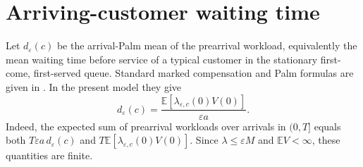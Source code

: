 \documentclass[10pt,a4paper]{amsart}
\numberwithin{equation}{section}
\newcommand{\E}{\mathbb E}
\newcommand{\1}{\mathbf 1}
\newcommand{\eps}{\varepsilon}
\begin{document}
\section{Arriving-customer waiting time}\label{sec:palm}
Let $d_\eps(c)$ be the arrival-Palm mean of the prearrival workload, equivalently the mean waiting time before service of a typical customer in the stationary first-come, first-served queue. Standard marked compensation and Palm formulas are given in \cite{Bremaud81,BB03,LP18}. In the present model they give
\begin{equation}\label{eq:palm}
 d_\eps(c)=\frac{\E[\lambda_{\eps,c}(0)V(0)]}{\eps a}.
\end{equation}
Indeed, the expected sum of prearrival workloads over arrivals in $(0,T]$ equals both $T\eps a\,d_\eps(c)$ and $T\E[\lambda_{\eps,c}(0)V(0)]$. Since $\lambda\le\eps M$ and $\E V<\infty$, these quantities are finite.
\end{document}

